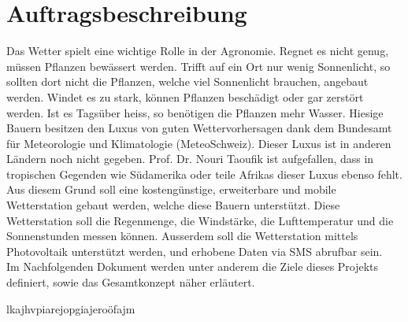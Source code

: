 \section{Auftragsbeschreibung}
Das Wetter spielt eine wichtige Rolle in der Agronomie. Regnet es nicht genug, müssen Pflanzen bewässert werden. Trifft auf ein Ort nur wenig Sonnenlicht, so sollten dort nicht die Pflanzen, welche viel Sonnenlicht brauchen, angebaut werden. Windet es zu stark, können Pflanzen beschädigt oder gar zerstört werden. Ist es Tagsüber heiss, so benötigen die Pflanzen mehr Wasser. Hiesige Bauern besitzen den Luxus von guten Wettervorhersagen dank dem Bundesamt für Meteorologie und Klimatologie (MeteoSchweiz). Dieser Luxus ist in anderen Ländern noch nicht gegeben. Prof. Dr. Nouri Taoufik ist aufgefallen, dass in tropischen Gegenden wie Südamerika oder teile Afrikas dieser Luxus ebenso fehlt. \\[0.5cm]
Aus diesem Grund soll eine kostengünstige, erweiterbare und mobile Wetterstation gebaut werden, welche diese Bauern unterstützt. Diese Wetterstation soll die Regenmenge, die Windstärke, die Lufttemperatur und die Sonnenstunden messen können. Ausserdem soll die Wetterstation mittels Photovoltaik unterstützt werden, und erhobene Daten via SMS abrufbar sein. \\[0.5cm]
Im Nachfolgenden Dokument werden unter anderem die Ziele dieses Projekts definiert, sowie das Gesamtkonzept näher erläutert.


lkajhvpiarejopgiajeroöfajm